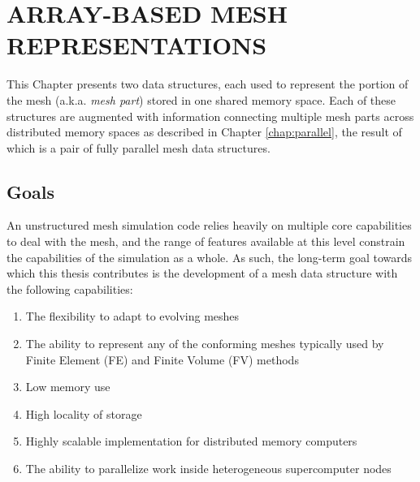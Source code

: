 
\chapter{ARRAY-BASED MESH REPRESENTATIONS}
\label{chap:struct}

This Chapter presents two data structures, each used to represent
the portion of the mesh (a.k.a. \emph{mesh part}) stored in one
shared memory space.
Each of these structures are augmented with information connecting multiple
mesh parts across distributed memory spaces as described in
Chapter \ref{chap:parallel}, the result of which is a pair of fully parallel
mesh data structures.

\section{Goals}
\label{sec:struct_goals}

An unstructured mesh simulation code relies heavily on
multiple core capabilities to deal with the mesh,
and the range of features available at this level constrain
the capabilities of the simulation as a whole.
As such, the long-term goal towards which this thesis
contributes is the development of a mesh data structure
with the following capabilities:

\begin{enumerate}
\item The flexibility to adapt to evolving meshes
\item The ability to represent any of the conforming meshes typically
used by Finite Element (FE) and Finite Volume (FV) methods
\item Low memory use
\item High locality of storage
\item Highly scalable implementation for distributed memory computers
\item The ability to parallelize work inside heterogeneous
supercomputer nodes
\end{enumerate}

